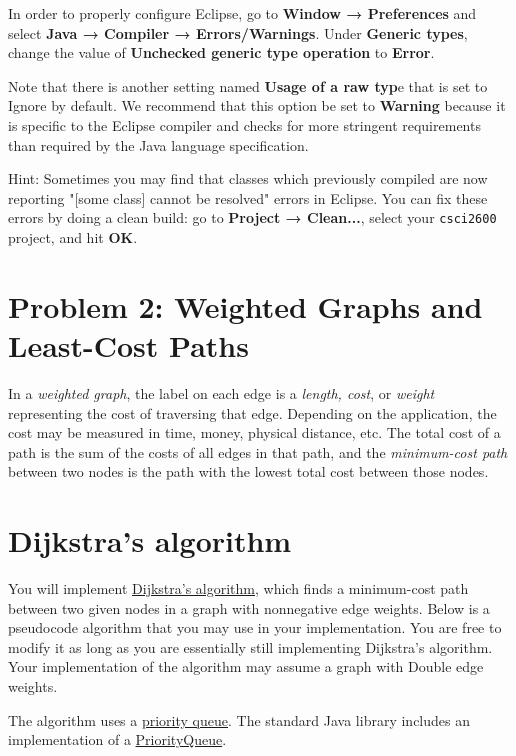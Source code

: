 \documentclass[11pt]{article}
\begin{document}
\noindent In order to properly configure Eclipse, go to \textbf{Window → Preferences} and select \textbf{Java → Compiler → Errors/Warnings}. Under \textbf{Generic types}, change the value of \textbf{Unchecked generic type operation} to 
\textbf{Error}.

\noindent Note that there is another setting named \textbf{Usage of a raw typ}e that is set to Ignore by default. We recommend that this option be set to \textbf{Warning} because it is specific to the Eclipse compiler and checks for more stringent requirements than required by the Java language specification.

\noindent Hint: Sometimes you may find that classes which previously compiled are now reporting "[some class] cannot be resolved" errors in Eclipse. You can fix these errors by doing a clean build: go to \textbf{Project → Clean...}, select your \texttt{csci2600} project, and hit \textbf{OK}.

\section*{Problem 2: Weighted Graphs and Least-Cost Paths}
\label{sec:Problem 2}

In a \textit{weighted graph}, the label on each edge is a \textit{length, cost}, or \textit{weight} representing the cost of traversing that edge. Depending on the application, the cost may be measured in time, money, physical distance, etc. The total cost of a path is the sum of the costs of all edges in that path, and the \textit{minimum-cost path} between two nodes is the path with the lowest total cost between those nodes.

\section*{Dijkstra's algorithm}
\label{sec:Dijkstra's algorithm}

You will implement \href{https://en.wikipedia.org/wiki/Dijkstra%27s_algorithm}{Dijkstra's algorithm}, which finds a minimum-cost path between two given nodes in a graph with nonnegative edge weights. Below is a pseudocode algorithm that you may use in your implementation. You are free to modify it as long as you are essentially still implementing Dijkstra's algorithm. Your implementation of the algorithm may assume a graph with Double edge weights.

The algorithm uses a \href{http://en.wikipedia.org/wiki/Priority_queue}{priority queue}. The standard Java library includes an implementation of a \href{http://docs.oracle.com/javase/8/docs/api/java/util/PriorityQueue.html}{PriorityQueue}.
\end{document}
